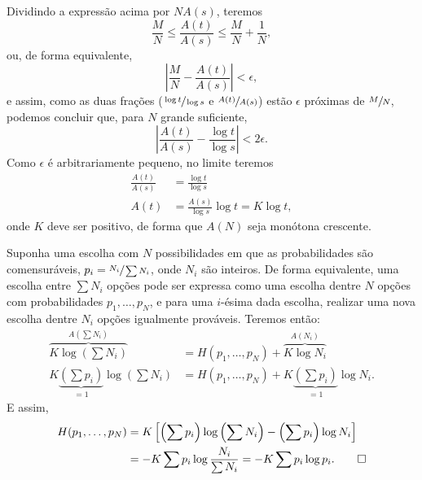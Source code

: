 \begin{interlude}
  Dividindo a expressão acima por $NA(s)$, teremos
  \begin{equation}
  \frac{M}{N} \leq \frac{A(t)}{A(s)} \leq \frac{M}{N} + \frac{1}{N} ,
  \end{equation}
  ou, de forma equivalente,
  \begin{equation}
  \left\vert \frac{M}{N} - \frac{A(t)}{A(s)} \right\vert < \epsilon ,
  \end{equation}
  e assim, como as duas frações ($\sfrac{\log t}{\log s}$ e
  $\sfrac{A(t)}{A(s)}$) estão $\epsilon$ próximas de $\sfrac{M}{N}$,
  podemos concluir que, para $N$ grande suficiente,
  \begin{equation}
  \left\vert \frac{A(t)}{A(s)} - \frac{\log t}{\log s} \right\vert < 2\epsilon .
  \end{equation}
  Como $\epsilon$ é arbitrariamente pequeno, no limite teremos
  \begin{subequations}
  \begin{align}
  \frac{A(t)}{A(s)} &= \frac{\log t}{\log s} \\
  A(t) &= \frac{A(s)}{\log s} \log t = K \log t ,
  \end{align}
  \end{subequations}
  onde $K$ deve ser positivo, de forma que $A(N)$ seja monótona crescente.

  Suponha uma escolha com $N$ possibilidades em que as probabilidades são
  comensuráveis, $p_i = \sfrac{N_i}{\sum N_i}$, onde $N_i$ são inteiros. De
  forma equivalente, uma escolha entre $\sum N_i$ opções pode ser expressa como
  uma escolha dentre $N$ opções com probabilidades $p_1, \ldots, p_N$, e para
  uma $i$-ésima dada escolha, realizar uma nova escolha dentre $N_i$ opções
  igualmente prováveis. Teremos então:
  \begin{subequations}
  \begin{align}
  \overbrace{ K \log \left( \sum N_i \right) }^{A\left( \sum N_i \right)} &= H(p_1, \ldots, p_N) + \overbrace{ K \log N_i }^{A(N_i)} \\
  K \underbrace{\left( \sum p_i \right)}_{=1} \log \left( \sum N_i \right) &= H(p_1, \ldots, p_N) + K \underbrace{\left( \sum p_i \right)}_{=1} \log N_i .
  \end{align}
  \end{subequations}
  E assim,
  \begin{subequations}
  \begin{align}
  H(p_1, \ldots, p_N) &= K\left[ \left( \sum p_i \right) \log \left( \sum N_i \right) - \left( \sum p_i \right) \log N_i \right] \\
        &= -K \sum p_i \log \frac{N_i}{\sum N_i} = -K \sum p_i \log p_i . \qed
  \end{align}
  \end{subequations}
  \label{endof:interlude:appendix2}
\end{interlude}


